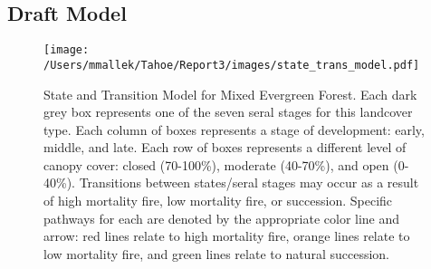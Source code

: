 \subsection*{Draft Model}
\begin{figure}[htbp]
\centering
\texttt{[image: /Users/mmallek/Tahoe/Report3/images/state\_trans\_model.pdf]}
\caption{State and Transition Model for Mixed Evergreen Forest. Each dark grey box represents one of the seven seral stages for this landcover type. Each column of boxes represents a stage of development: early, middle, and late. Each row of boxes represents a different level of canopy cover: closed (70-100\%), moderate (40-70\%), and open (0-40\%). Transitions between states/seral stages may occur as a result of high mortality fire, low mortality fire, or succession. Specific pathways for each are denoted by the appropriate color line and arrow: red lines relate to high mortality fire, orange lines relate to low mortality fire, and green lines relate to natural succession.} 
\label{meg_transmodel}
\end{figure}

\clearpage
